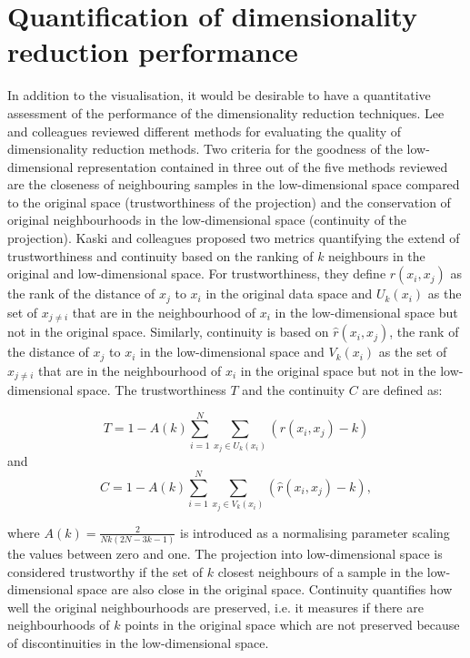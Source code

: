 \section{Quantification of dimensionality reduction performance}
\label{section:Quantification-DimRed}
In addition to the visualisation, it would be desirable to have a quantitative assessment of the performance of the dimensionality reduction techniques. Lee and colleagues \citeyear{Lee2009} reviewed different methods for evaluating the quality of dimensionality reduction methods. Two criteria for the goodness of the low-dimensional representation contained in three out of the five methods reviewed are the closeness of neighbouring samples in the low-dimensional space compared to the original space (trustworthiness of the projection) and the conservation of original neighbourhoods in the low-dimensional space (continuity of the projection). Kaski and colleagues \citep{Kaski2003} proposed two metrics quantifying the extend of trustworthiness and continuity based on the ranking of \(k\) neighbours in the original and low-dimensional space. For trustworthiness, they define \(r(x_i, x_j)\) as the rank of the distance of \(x_j\) to  \(x_i\) in the original data space and \(U_k(x_i)\) as the set of \(x_{j \neq i}\) that are in the neighbourhood of \(x_i\) in the low-dimensional space but not in the original space. Similarly, continuity is based on \(\hat{r}(x_i, x_j)\), the rank of the distance of \(x_j\) to  \(x_i\) in the low-dimensional space and \(V_k(x_i)\) as the set of \(x_{j \neq i}\) that are in the neighbourhood of \(x_i\) in the original space but not in the low-dimensional space. The trustworthiness \(T\) and the continuity \(C\) are defined as:

\begin{equation}
T =  1- A(k)\sum^{N}_{i=1}\sum^{}_{x_j \in U_k(x_i)}(r(x_i, x_j) - k)
\label{eq:trustworthiness}
\end{equation}
and 
\begin{equation}
C =  1- A(k)\sum^{N}_{i=1}\sum^{}_{x_j \in V_k(x_i)}(\hat{r}(x_i, x_j) - k),
\label{eq:continuity}
\end{equation}

where \(A(k) = \frac{2}{Nk(2N -3k -1)}\) is introduced as a normalising parameter scaling the values between zero and one. The projection into low-dimensional space is considered trustworthy if the set of \(k\) closest neighbours of a sample in the low-dimensional space are also close in the original space. Continuity quantifies how well the original neighbourhoods are preserved, i.e. it measures if there are neighbourhoods of \(k\) points in the original space which are not preserved because of discontinuities in the low-dimensional space. 

